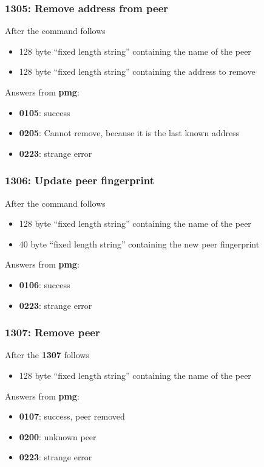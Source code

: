 \documentclass[12pt,a4paper]{book}
\begin{document}
\subsubsection{1305: Remove address from peer}
After the command follows
\begin{itemize}
\item 128 byte "`fixed length string"' containing the name of the peer
\item 128 byte "`fixed length string"' containing the address to remove
\end{itemize}
Answers from \textbf{pmg}:
\begin{itemize}
\item \textbf{0105}: success
\item \textbf{0205}: Cannot remove, because it is the last known address
\item \textbf{0223}: strange error
\end{itemize}
\subsubsection{1306: Update peer fingerprint}
After the command follows
\begin{itemize}
\item 128 byte "`fixed length string"' containing the name of the peer
\item 40  byte "`fixed length string"' containing the new peer fingerprint
\end{itemize}
Answers from \textbf{pmg}:
\begin{itemize}
\item \textbf{0106}: success
\item \textbf{0223}: strange error
\end{itemize}
\subsubsection{1307: Remove peer}
After the \textbf{1307} follows
\begin{itemize}
\item 128 byte "`fixed length string"' containing the name of the peer
\end{itemize}
Answers from \textbf{pmg}:
\begin{itemize}
\item \textbf{0107}: success, peer removed
\item \textbf{0200}: unknown peer
\item \textbf{0223}: strange error
\end{itemize}
\end{document}
